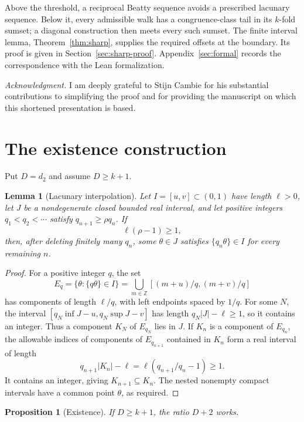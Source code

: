 \documentclass[11pt,a4paper,reqno]{amsart}
\newtheorem{lemma}[theorem]{Lemma}
\newtheorem{proposition}[theorem]{Proposition}
\theoremstyle{definition}
\theoremstyle{remark}
\newcommand{\ZZ}{\mathbb Z}
\begin{document}
Above the threshold, a reciprocal Beatty sequence avoids a prescribed lacunary
sequence. Below it, every admissible walk has a congruence-class tail in its
$k$-fold sumset; a diagonal construction then meets every such sumset. The
finite interval lemma, Theorem~\ref{thm:sharp}, supplies the required offsets
at the boundary. Its proof is given in Section~\ref{sec:sharp-proof}.
Appendix~\ref{sec:formal} records the correspondence with the Lean formalization.

\medskip\noindent\emph{Acknowledgment.}
I am deeply grateful to Stijn Cambie for his substantial contributions to
simplifying the proof and for providing the manuscript on which this shortened
presentation is based.

\section{The existence construction}
Put $D=d_2$ and assume $D\ge k+1$.
\begin{lemma}[Lacunary interpolation]\label{lem:interpolation}
Let $I=[u,v]\subset(0,1)$ have length $\ell>0$, let $J$ be a
nondegenerate closed bounded real interval, and let positive integers
$q_1<q_2<\cdots$ satisfy $q_{n+1}\ge\rho q_n$. If
\begin{equation}\label{eq:interpolation-cost}
 \ell(\rho-1)\ge1,
\end{equation}
then, after deleting finitely many $q_n$, some $\theta\in J$ satisfies
$\{q_n\theta\}\in I$ for every remaining $n$.
\end{lemma}
\begin{proof}
For a positive integer $q$, the set
\[
 E_q=\{\theta:\{q\theta\}\in I\}
 =\bigcup_{m\in\ZZ}[(m+u)/q,(m+v)/q]
\]
has components of length $\ell/q$, with left endpoints spaced by $1/q$.
For some $N$, the interval
$[q_N\inf J-u,q_N\sup J-v]$ has length $q_N|J|-\ell\ge1$,
so it contains an integer. Thus a component $K_N$ of $E_{q_N}$ lies in $J$.
If $K_n$ is a component of $E_{q_n}$, the allowable indices of components
of $E_{q_{n+1}}$ contained in $K_n$ form a real interval of length
\[
 q_{n+1}|K_n|-\ell
 =\ell(q_{n+1}/q_n-1)\ge1.
\]
It contains an integer, giving $K_{n+1}\subseteq K_n$. The nested nonempty
compact intervals have a common point $\theta$, as required.
\end{proof}
\begin{proposition}[Existence]\label{prop:existence}
If $D\ge k+1$, the ratio $D+2$ works.
\end{proposition}
\end{document}
